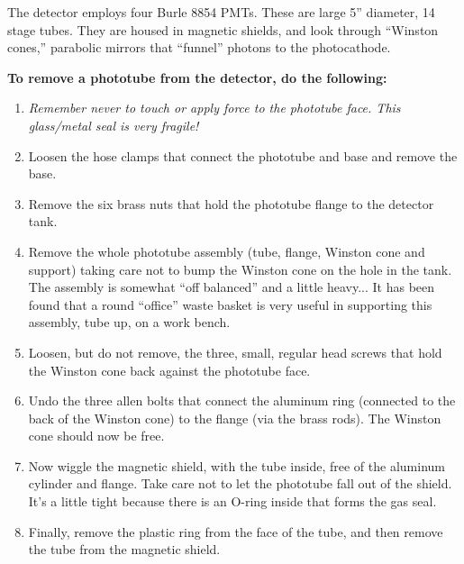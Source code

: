 	The detector employs four Burle 8854 PMTs.  These are large
5'' diameter, 14 stage tubes.  They are housed in magnetic shields,
and look through ``Winston cones,'' parabolic mirrors that ``funnel''
photons to the photocathode.

	{\bf To remove a phototube from the detector, do the following:}

\begin{enumerate}
\item {\em Remember never to touch or apply force to the phototube face.  This
glass/metal seal is very fragile!}

\item  Loosen the hose clamps that connect the phototube and base and remove
the base.

\item  Remove the six brass nuts that hold the phototube flange to the
detector tank.

\item  Remove the whole phototube assembly (tube, flange, Winston cone and
support) taking care not to bump the Winston cone on the hole in the
tank.  The assembly is somewhat ``off balanced'' and a little heavy...  It
has been found that a round ``office'' waste basket is very useful in
supporting this assembly, tube up, on a work bench.

\item  Loosen, but do not remove, the three, small, regular head screws
that hold the Winston cone back against the phototube face.

\item Undo the three allen bolts that connect the aluminum ring (connected
to the back of the Winston cone) to the flange (via the brass rods).
The Winston cone should now be free.

\item Now wiggle the magnetic shield, with the tube inside, free of the
aluminum cylinder and flange.  Take care not to let the phototube fall
out of the shield.  It's a little tight because there is an
O-ring inside that forms the gas seal.

\item  Finally, remove the plastic ring from the face of the tube, and then
remove the tube from the magnetic shield.
\end{enumerate}

